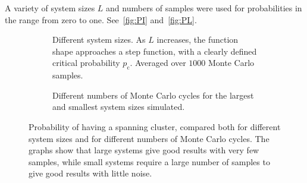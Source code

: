 \documentclass[11pt,british,a4paper]{report}
\begin{document}
A variety of system sizes \(L\) and numbers of samples were used for probabilities in the range from zero to one. See~\vref{fig:PI} and~\vref{fig:PL}.
\begin{figure}[H]
    \centering
    \begin{subfigure}{\textwidth}
        \centering
        \caption{Different system sizes. As \(L\) increases, the function shape approaches a step function, with a clearly defined critical probability \(p_\mathrm{c}\). Averaged over \(\num{1000}\) Monte Carlo samples.}%
    \end{subfigure}
    \begin{subfigure}{\textwidth}
        \centering
        \caption{Different numbers of Monte Carlo cycles for the largest and smallest system sizes simulated.}%
    \end{subfigure}
    \caption{Probability of having a spanning cluster, compared both for different system sizes and for different numbers of Monte Carlo cycles. The graphs show that large systems give good results with very few samples, while small systems require a large number of samples to give good results with little noise.}
    \label{fig:PI}
\end{figure}
\end{document}

